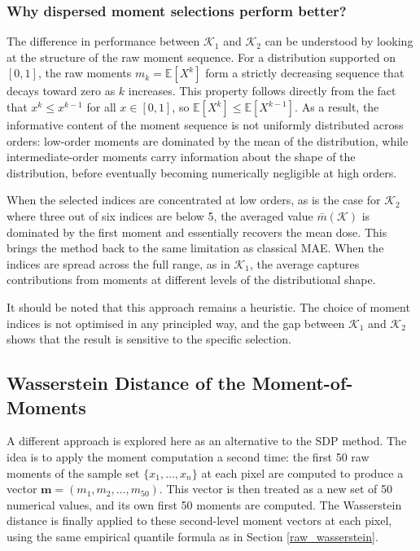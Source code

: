 \documentclass[12pt]{article}
\begin{document}
\subsubsection*{Why dispersed moment selections perform better?}

The difference in performance between $\mathcal{K}_1$ and $\mathcal{K}_2$ can
be understood by looking at the structure of the raw moment sequence. For a
distribution supported on $[0,1]$, the raw moments $m_k = \mathbb{E}[X^k]$
form a strictly decreasing sequence that decays toward zero as $k$ increases.
This property follows directly from the fact that $x^k \leq x^{k-1}$ for all
$x \in [0,1]$, so $\mathbb{E}[X^k] \leq \mathbb{E}[X^{k-1}]$. As a result,
the informative content of the moment sequence is not uniformly distributed
across orders: low-order moments are dominated by the mean of the distribution,
while intermediate-order moments carry information about the shape of the
distribution, before eventually becoming
numerically negligible at high orders.

When the selected indices are concentrated at low orders, as is the case for
$\mathcal{K}_2$ where three out of six indices are below 5, the averaged value
$\bar{m}(\mathcal{K})$ is dominated by the first moment and essentially
recovers the mean dose. This brings the method back to the same limitation as
classical MAE. When the indices are spread across the full range, as in
$\mathcal{K}_1$, the average captures contributions from moments at different
levels of the distributional shape.

It should be noted that this approach remains a heuristic. The choice of moment
indices is not optimised in any principled way, and the gap between $\mathcal{K}_1$
and $\mathcal{K}_2$ shows that the result is sensitive to the specific selection.
\subsection{Wasserstein Distance of the Moment-of-Moments}
 
A different approach is explored here as an alternative to the SDP method. The
idea is to apply the moment computation a second time: the first 50 raw moments
of the sample set $\{x_1, \ldots, x_n\}$ at each pixel are computed to produce
a vector $\mathbf{m} = (m_1, m_2, \ldots, m_{50})$. This vector is then treated
as a new set of 50 numerical values, and its own first 50 moments are computed.
The Wasserstein distance is finally applied to these second-level moment vectors
at each pixel, using the same empirical quantile formula as in Section \ref{raw_wasserstein}.
 
\end{document}
